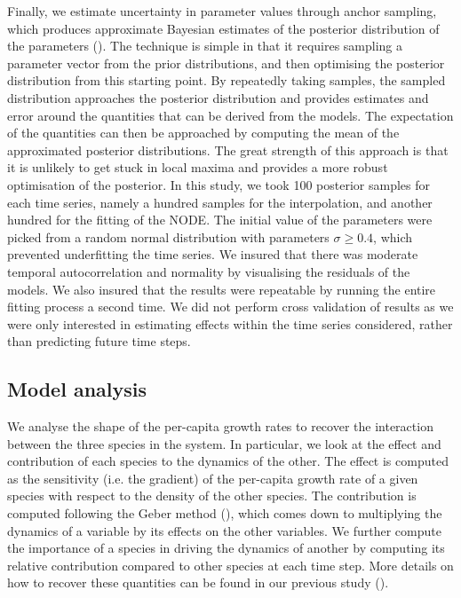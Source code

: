 \documentclass[11pt, oneside]{article}
\begin{document}
Finally, we estimate uncertainty in parameter values through anchor sampling, which produces approximate Bayesian estimates of the posterior distribution of the parameters (\cite{Pearce2018}).
The technique is simple in that it requires sampling a parameter vector from the prior distributions, and then optimising the posterior distribution from this starting point.
By repeatedly taking samples, the sampled distribution approaches the posterior distribution and provides estimates and error around the quantities that can be derived from the models.
The expectation of the quantities can then be approached by computing the mean of the approximated posterior distributions.
The great strength of this approach is that it is unlikely to get stuck in local maxima and provides a more robust optimisation of the posterior.
In this study, we took 100 posterior samples for each time series, namely a hundred samples for the interpolation, and another hundred for the fitting of the NODE.
The initial value of the parameters were picked from a random normal distribution with parameters $\sigma \geq 0.4$, which prevented underfitting the time series.
We insured that there was moderate temporal autocorrelation and normality by visualising the residuals of the models.
We also insured that the results were repeatable by running the entire fitting process a second time.
We did not perform cross validation of results as we were only interested in estimating effects within the time series considered, rather than predicting future time steps.


\subsection{Model analysis}

We analyse the shape of the per-capita growth rates to recover the interaction between the three species in the system.
In particular, we look at the effect and contribution of each species to the dynamics of the other.
The effect is computed as the sensitivity (i.e. the gradient) of the per-capita growth rate of a given species with respect to the density of the other species.
The contribution is computed following the Geber method (\cite{Hairston2005}), which comes down to multiplying the dynamics of a variable by its effects on the other variables.
We further compute the importance of a species in driving the dynamics of another by computing its relative contribution compared to other species at each time step.
More details on how to recover these quantities can be found in our previous study (\cite{Bonnaffe2021a}).
\end{document}
